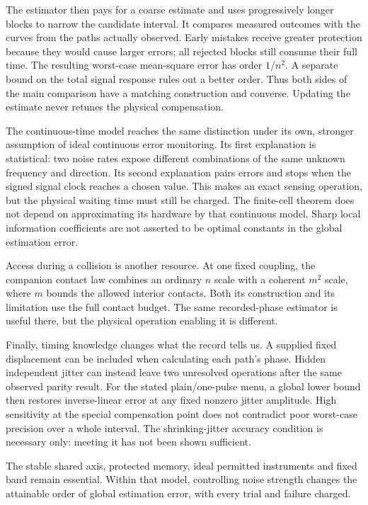 \documentclass[11pt,a4paper]{article}
\numberwithin{equation}{section}
\theoremstyle{remark}
\begin{document}
The estimator then pays for a coarse estimate and uses progressively longer
blocks to narrow the candidate interval. It compares measured outcomes with
the curves from the paths actually observed. Early mistakes receive greater
protection because they would cause larger errors; all rejected blocks still
consume their full time. The resulting worst-case mean-square error has order
$1/n^2$. A separate bound on the total signal response rules out a better
order. Thus both sides of the main comparison have a matching construction
and converse. Updating the estimate never retunes the physical compensation.

The continuous-time model reaches the same distinction under its own,
stronger assumption of ideal continuous error monitoring. Its first
explanation is statistical: two noise rates expose different combinations of
the same unknown frequency and direction. Its second explanation pairs errors
and stops when the signed signal clock reaches a chosen value. This makes an
exact sensing operation, but the physical waiting time must still be charged.
The finite-cell theorem does not depend on approximating its hardware by
that continuous model. Sharp local information coefficients are not asserted
to be optimal constants in the global estimation error.

Access during a collision is another resource. At one fixed coupling,
the companion contact law combines an ordinary $n$ scale with a coherent
$m^2$ scale, where $m$ bounds the allowed interior contacts. Both its
construction and its limitation use the full contact budget. The same
recorded-phase estimator is useful there, but the physical operation enabling
it is different.

Finally, timing knowledge changes what the record tells us. A supplied
fixed displacement can be included when calculating each path's phase.
Hidden independent jitter can instead leave two unresolved operations after
the same observed parity result. For the stated plain/one-pulse menu,
a global lower bound then restores inverse-linear error at any fixed
nonzero jitter amplitude. High sensitivity at the special compensation point
does not contradict poor worst-case precision over a whole interval.
The shrinking-jitter accuracy condition is necessary only: meeting it has
not been shown sufficient.

The stable shared axis, protected memory, ideal permitted instruments and
fixed band remain essential. Within that model, controlling noise strength
changes the attainable order of global estimation error, with every trial
and failure charged.
\end{document}
